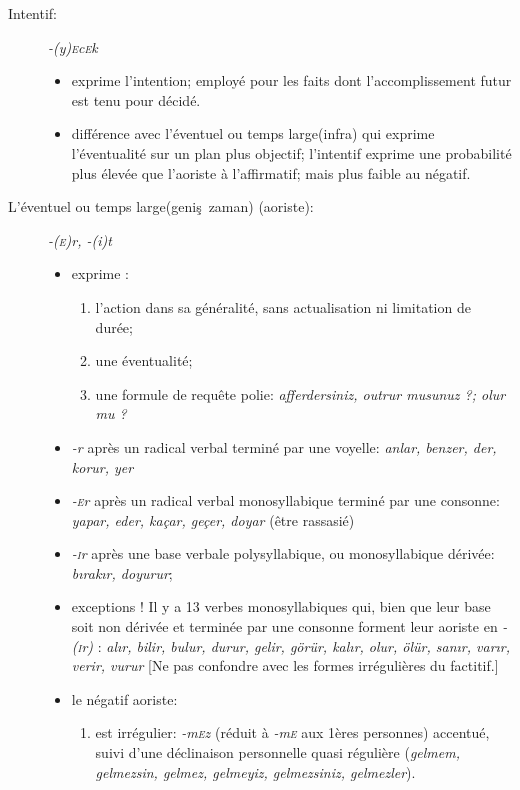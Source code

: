 \documentclass{cours}
\newcommand{\ch}{\c{s}}
\newcommand{\sci}{\textsc{i}}
\newcommand{\sce}{\textsc{e}}
\begin{document}
\begin{description}
    \item [Intentif:] {\sl -(y)\sce c\sce k}
          \begin{itemize}
              \item exprime l'intention; employé pour les faits dont l'accomplissement futur est tenu pour décidé.
              \item différence avec l'éventuel ou \og temps large\fg (infra) qui exprime l'éventualité sur un plan plus objectif; l'intentif exprime une probabilité plus élevée que l'aoriste à l'affirmatif; mais plus faible au négatif.
          \end{itemize}
    \item [L'éventuel ou \og temps large\fg (geni\ch\ zaman) (aoriste):] \textsl{-(\sce)r, -(i)t}
          \begin{itemize}
              \item exprime :
                    \begin{enumerate}
                        \item l'action dans sa généralité, sans actualisation ni limitation de durée;
                        \item une éventualité;
                        \item une formule de requête polie: \textsl{afferdersiniz, outrur musunuz ?; olur mu ?}
                    \end{enumerate}
              \item \textsl{-r} après un radical verbal terminé par une voyelle: \textsl{anlar, benzer, der, korur, yer}
              \item \textsl{-\sce r} après un radical verbal monosyllabique terminé par une consonne: \textsl{yapar, eder, kaçar, geçer, doyar} (être rassasié)
              \item \textsl{-\sci r} après une base verbale polysyllabique, ou monosyllabique dérivée: \textsl{b\i rak\i r, doyurur};
              \item exceptions ! Il y a 13 verbes monosyllabiques qui, bien que leur base soit non dérivée et terminée par une consonne forment leur aoriste en \textsl{-(\sci r)} : \textsl{al\i r, bilir, bulur, durur, gelir, görür, kal\i r, olur, ölür, san\i r, var\i r, verir, vurur} [Ne pas confondre avec les formes irrégulières du factitif.]
              \item le négatif aoriste:
                    \begin{enumerate}
                        \item est irrégulier: \textsl{-m\sce z} (réduit à \textsl{-m\sce} aux 1ères personnes) accentué, suivi d'une déclinaison personnelle quasi régulière (\textsl{gelmem, gelmezsin, gelmez, gelmeyiz, gelmezsiniz, gelmezler}).

\end{enumerate}
\end{itemize}
\end{description}
\end{document}
